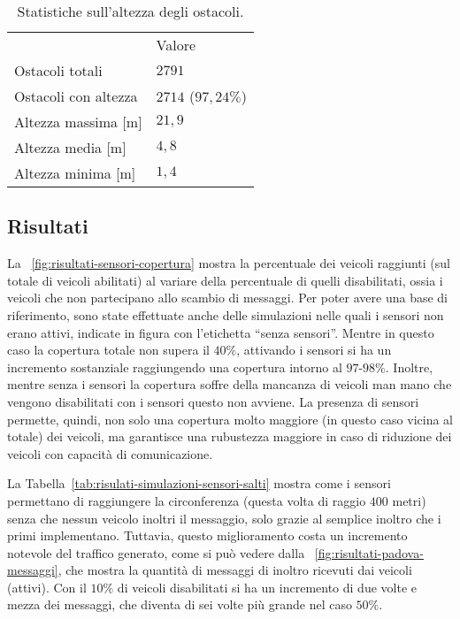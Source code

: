 %
\begin{table}[htbp]
	\centering
	  \begin{tabular}{| L{.4\linewidth} | C{.2\linewidth} |}
			\toprule
																	&		Valore 								\\
			\thickerline
			Ostacoli totali							&		$2791$							\\ \hline
			Ostacoli con altezza				&		$2714$ ($97,24\%$)		\\ \hline
			Altezza massima	[m]					&		$21,9$								\\ \hline
			Altezza media	[m]						&		$4,8$									\\ \hline
			Altezza minima [m]					&		$1,4$									\\
			\bottomrule
	  \end{tabular}
	\caption{Statistiche sull'altezza degli ostacoli.\label{tab:simulazioni-sensori-altezze-edfici}}
\end{table}
%
\subsection{Risultati}\label{sec:configurazione-sensori-risultati}
La \figurename~\ref{fig:risultati-sensori-copertura}\footnotemark{} mostra la percentuale dei veicoli raggiunti
(sul totale di veicoli abilitati) al variare della percentuale di quelli disabilitati,
ossia i veicoli che non partecipano allo scambio di messaggi.
Per poter avere una base di riferimento, sono state effettuate anche delle simulazioni nelle quali i sensori non erano attivi,
indicate in figura con l'etichetta ``senza sensori''.
Mentre in questo caso la copertura totale non supera il $40\%$,
attivando i sensori si ha un incremento sostanziale raggiungendo una copertura intorno al $97$-$98\%$.
Inoltre, mentre senza i sensori la copertura soffre della mancanza di veicoli man mano che vengono disabilitati
con i sensori questo non avviene.
La presenza di sensori permette, quindi, non solo una copertura molto maggiore (in questo caso vicina al totale)
dei veicoli, ma garantisce una rubustezza maggiore in caso di riduzione dei veicoli con capacità di comunicazione.

La Tabella~\ref{tab:risulati-simulazioni-sensori-salti} mostra come i sensori permettano di raggiungere
la circonferenza (questa volta di raggio $400$ metri) senza che nessun veicolo inoltri il messaggio,
solo grazie al semplice inoltro che i primi implementano.
Tuttavia, questo miglioramento costa un incremento notevole del traffico generato, come si può vedere dalla
\figurename~\ref{fig:risultati-padova-messaggi}, che mostra la quantità di messaggi di inoltro ricevuti
dai veicoli (attivi).
Con il $10\%$ di veicoli disabilitati si ha un incremento di due volte e mezza dei messaggi,
che diventa di sei volte più grande nel caso $50\%$.

